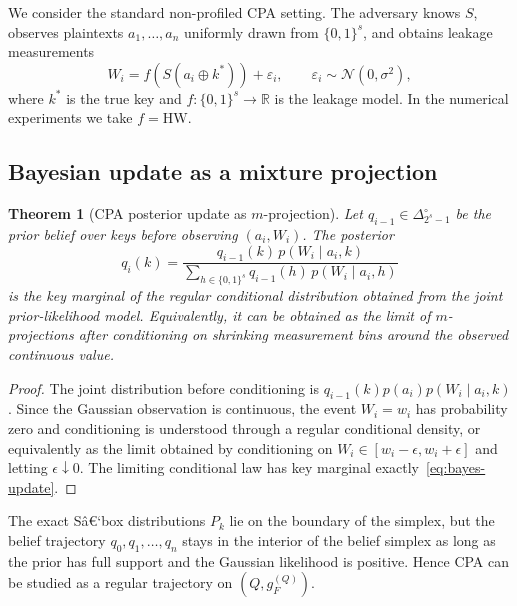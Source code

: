 \documentclass[referee,lineno,pdflatex,sn-mathphys-num]{sn-jnl}
\theoremstyle{thmstylethree}
\theoremstyle{thmstyletwo}
\theoremstyle{thmstyleone}
\newtheorem{theorem}{Theorem}[section]
\newcommand{\R}{\mathbb{R}}
\newcommand{\HW}{\mathrm{HW}}
\newcommand{\B}[1]{\{0,1\}^{#1}}
\begin{document}
We consider the standard non-profiled CPA setting.  The adversary knows $S$,
observes plaintexts $a_1,\ldots,a_n$ uniformly drawn from $\B{s}$, and obtains
leakage measurements
\begin{equation}\label{eq:leakage-model}
  W_i = f(S(a_i\oplus k^*)) + \varepsilon_i,
  \qquad \varepsilon_i \sim \mathcal N(0,\sigma^2),
\end{equation}
where $k^*$ is the true key and $f:\B{s}\to\R$ is the leakage model.  In the
numerical experiments we take $f = \HW$.

\subsection{Bayesian update as a mixture projection}\label{subsec:bayes-m}

\begin{theorem}[CPA posterior update as $m$-projection]\label{thm:cpa-m-proj}
  Let $q_{i-1}\in\Delta_{2^s-1}^{\circ}$ be the prior belief over keys before
  observing $(a_i,W_i)$.  The posterior
  \begin{equation}\label{eq:bayes-update}
    q_i(k) = \frac{q_{i-1}(k)\,p(W_i\mid a_i,k)}
                 {\sum_{h\in\B{s}} q_{i-1}(h)\,p(W_i\mid a_i,h)}
  \end{equation}
  is the key marginal of the regular conditional distribution obtained from
  the joint prior-likelihood model.  Equivalently, it can be obtained as the
  limit of $m$-projections after conditioning on shrinking measurement bins
  around the observed continuous value.
\end{theorem}

\begin{proof}
  The joint distribution before conditioning is $q_{i-1}(k)p(a_i)p(W_i\mid a_i,k)$.
  Since the Gaussian observation is continuous, the event $W_i=w_i$ has
  probability zero and conditioning is understood through a regular conditional
  density, or equivalently as the limit obtained by conditioning on
  $W_i\in[w_i-\epsilon,w_i+\epsilon]$ and letting $\epsilon\downarrow0$.
  The limiting conditional law has key marginal exactly~\eqref{eq:bayes-update}.
\end{proof}

The exact Sâ€‘box distributions $P_k$ lie on the boundary of the simplex, but
the belief trajectory $q_0,q_1,\ldots,q_n$ stays in the interior of the belief
simplex as long as the prior has full support and the Gaussian likelihood is
positive.  Hence CPA can be studied as a regular trajectory on $(Q,g_F^{(Q)})$.
\end{document}
